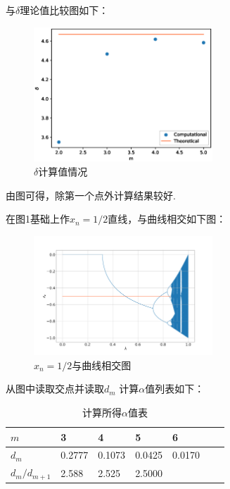 \documentclass[12pt,a4paper,utf8]{ctexart}
\begin{document}
与$\delta$理论值比较图如下：
\begin{figure}[!h]
    \centering
    \includegraphics[width=0.6\textwidth]{err1.eps}
    \caption{$\delta$计算值情况}
\end{figure}
由图可得，除第一个点外计算结果较好. 

在图1基础上作$x_n=1/2$直线，与曲线相交如下图：
\begin{figure}[!h]
    \centering
    \includegraphics[width=0.6\textwidth]{alpha.png}
    \caption{$x_n=1/2$与曲线相交图}
\end{figure}

从图中读取交点并读取$d_m$
计算$\alpha$值列表如下：
\begin{table}[!h]
    \centering
    \caption{计算所得$\alpha$值表}
\begin{tabular}{|l|l|l|l|l|l|l|}
\hline
$m$           & 3      & 4      & 5      & 6      \\ \hline
$d_m$         & 0.2777 & 0.1073 & 0.0425 & 0.0170 \\ \hline
$d_m/d_{m+1}$ & 2.588  & 2.525  & 2.5000 &        \\ \hline
\end{tabular}
\end{table}
\end{document}

